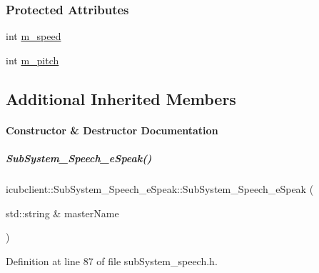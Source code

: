 \subsubsection*{Protected Attributes}
\begin{DoxyCompactItemize}
\item 
int \hyperlink{group__icubclient__subsystems_a471c23d3bf075f53adf10ab1d141b54c}{m\+\_\+speed}
\item 
int \hyperlink{group__icubclient__subsystems_ab7ef0d98bc1e7f356ed3d28c4d0c2769}{m\+\_\+pitch}
\end{DoxyCompactItemize}
\subsection*{Additional Inherited Members}


\paragraph{Constructor \& Destructor Documentation}
\mbox{\label{group__icubclient__subsystems_a09caab114b55db370a0e5d9add29d0c1}} 
\subparagraph{\texorpdfstring{Sub\+System\+\_\+\+Speech\+\_\+e\+Speak()}{SubSystem\_Speech\_eSpeak()}}
{\footnotesize\ttfamily icubclient\+::\+Sub\+System\+\_\+\+Speech\+\_\+e\+Speak\+::\+Sub\+System\+\_\+\+Speech\+\_\+e\+Speak (\begin{DoxyParamCaption}\item[{std\+::string \&}]{master\+Name }\end{DoxyParamCaption})\hspace{0.3cm}{\ttfamily [inline]}}



Definition at line 87 of file sub\+System\+\_\+speech.\+h.



